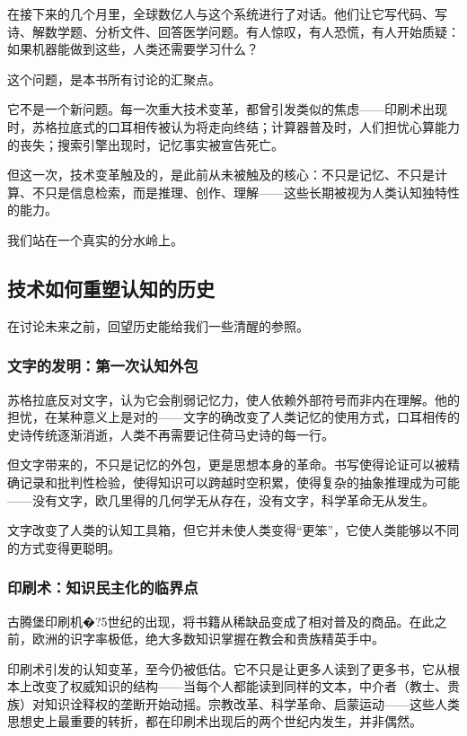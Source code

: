 \documentclass[11pt]{article}
\begin{document}
在接下来的几个月里，全球数亿人与这个系统进行了对话。他们让它写代码、写诗、解数学题、分析文件、回答医学问题。有人惊叹，有人恐慌，有人开始质疑：如果机器能做到这些，人类还需要学习什么？

这个问题，是本书所有讨论的汇聚点。

它不是一个新问题。每一次重大技术变革，都曾引发类似的焦虑——印刷术出现时，苏格拉底式的口耳相传被认为将走向终结；计算器普及时，人们担忧心算能力的丧失；搜索引擎出现时，记忆事实被宣告死亡。

但这一次，技术变革触及的，是此前从未被触及的核心：不只是记忆、不只是计算、不只是信息检索，而是推理、创作、理解——这些长期被视为人类认知独特性的能力。

我们站在一个真实的分水岭上。
\subsection{技术如何重塑认知的历史}
\label{sec:org77b485b}

在讨论未来之前，回望历史能给我们一些清醒的参照。
\subsubsection{文字的发明：第一次认知外包}
\label{sec:orgef6d2e2}

苏格拉底反对文字，认为它会削弱记忆力，使人依赖外部符号而非内在理解。他的担忧，在某种意义上是对的——文字的确改变了人类记忆的使用方式，口耳相传的史诗传统逐渐消逝，人类不再需要记住荷马史诗的每一行。

但文字带来的，不只是记忆的外包，更是思想本身的革命。书写使得论证可以被精确记录和批判性检验，使得知识可以跨越时空积累，使得复杂的抽象推理成为可能——没有文字，欧几里得的几何学无从存在，没有文字，科学革命无从发生。

文字改变了人类的认知工具箱，但它并未使人类变得“更笨”，它使人类能够以不同的方式变得更聪明。
\subsubsection{印刷术：知识民主化的临界点}
\label{sec:org1e45b81}

古腾堡印刷机�?5世纪的出现，将书籍从稀缺品变成了相对普及的商品。在此之前，欧洲的识字率极低，绝大多数知识掌握在教会和贵族精英手中。

印刷术引发的认知变革，至今仍被低估。它不只是让更多人读到了更多书，它从根本上改变了权威知识的结构——当每个人都能读到同样的文本，中介者（教士、贵族）对知识诠释权的垄断开始动摇。宗教改革、科学革命、启蒙运动——这些人类思想史上最重要的转折，都在印刷术出现后的两个世纪内发生，并非偶然。
\end{document}
